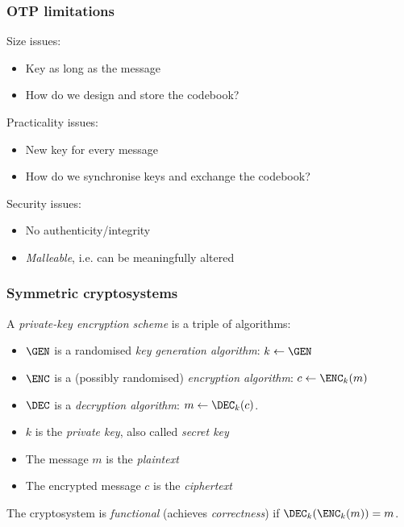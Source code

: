 \begin{frame}
  \frametitle{OTP limitations}

  \pause
  Size issues:
  \pause
  \begin{itemize}
    \item Key as long as the message
    \item How do we design and store the codebook?
  \end{itemize}

  \pause
  Practicality issues:
  \pause
  \begin{itemize}
    \item New key for every message
    \item How do we synchronise keys and exchange the codebook?
  \end{itemize}

  \pause
  Security issues:
  \pause
  \begin{itemize}
    \item No authenticity/integrity
    \item \emph{Malleable}, i.e. can be meaningfully altered
  \end{itemize}
\end{frame}

\begin{frame}
  \frametitle{Symmetric cryptosystems}

  A \emph{private-key encryption scheme} is a triple of algorithms:
  \begin{itemize}
    \pause\item $\GEN$ is a randomised \emph{key generation algorithm}: $k\gets\GEN$
    \pause\item $\ENC$ is a (possibly randomised) \emph{encryption algorithm}: $c\gets\ENC_k(m)$
    \pause\item $\DEC$ is a \emph{decryption algorithm}: $m\gets\DEC_k(c)$.
  \end{itemize}

  \vspace*{1em}

  \begin{itemize}
    \pause\item $k$ is the \emph{private key}, also called \emph{secret key}
    \pause\item The message $m$ is the \emph{plaintext}
    \pause\item The encrypted message $c$ is the \emph{ciphertext}
  \end{itemize}

  \vspace*{1em}

  \pause
  The cryptosystem is \emph{functional} (achieves \emph{correctness}) if $\DEC_k(\ENC_k(m))=m$.
\end{frame}

